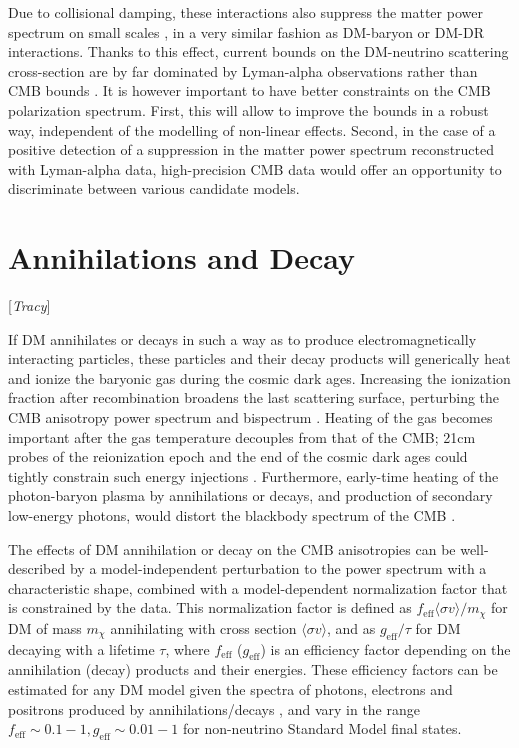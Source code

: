 \documentclass[12pt]{article}
\newcommand{\Contributors}[1]{ {\footnotesize [\textit{#1}]}}
\begin{document}
Due to collisional damping, these interactions also suppress the matter power spectrum on small scales \cite{Boehm:2001hm,Mangano:2006mp}, in a very similar fashion as DM-baryon or DM-DR interactions. Thanks to this effect, current bounds on the DM-neutrino scattering cross-section are by far dominated by Lyman-alpha observations \cite{Wilkinson:2014ksa} rather than CMB bounds \cite{Escudero:2015yka,DiValentino:2017oaw,Diacoumis:2018ezi}. It is however important to have better constraints on the CMB polarization spectrum. First, this will allow to improve the bounds in a robust way, independent of the modelling of non-linear effects. Second, in the case of a positive detection of a suppression in the matter power spectrum reconstructed with Lyman-alpha data, high-precision CMB data would offer an opportunity to discriminate between various candidate models.

\section{Annihilations and Decay}
\Contributors{Tracy}

If DM annihilates or decays in such a way as to produce electromagnetically interacting particles, these particles and their decay products will generically heat and ionize the baryonic gas during the cosmic dark ages. Increasing the ionization fraction after recombination broadens the last scattering surface, perturbing the CMB anisotropy power spectrum \cite{Adams:1998nr,Chen:2003gz, Padmanabhan:2005es} and bispectrum \cite{Dvorkin:2013cga}. Heating of the gas becomes important after the gas temperature decouples from that of the CMB; 21cm probes of the reionization epoch and the end of the cosmic dark ages could tightly constrain such energy injections \cite{Furlanetto:2006wp,Valdes:2007cu,Evoli:2014pva,Lopez-Honorez:2016sur,Poulin:2016anj}. Furthermore, early-time heating of the photon-baryon plasma by annihilations or decays, and production of secondary low-energy photons, would  distort the blackbody spectrum of the CMB \cite{Chluba:2013wsa}.

The effects of DM annihilation \cite{Slatyer:2015jla} or decay \cite{Slatyer:2016qyl} on the CMB anisotropies can be well-described by a model-independent perturbation to the power spectrum with a characteristic shape, combined with a model-dependent normalization factor that is constrained by the data. This normalization factor is defined as $f_\text{eff} \langle \sigma v \rangle/m_\chi$ for DM of mass $m_\chi$ annihilating with cross section $\langle \sigma v \rangle$, and as $g_\text{eff}/\tau$ for DM decaying with a lifetime $\tau$, where $f_\text{eff}$ ($g_\text{eff}$) is an efficiency factor depending on the annihilation (decay) products and their energies. These efficiency factors can be estimated for any DM model given the spectra of photons, electrons and positrons produced by annihilations/decays \cite{Slatyer:2015kla}, and vary in the range $f_\text{eff} \sim 0.1-1, g_\text{eff} \sim 0.01-1$ for non-neutrino Standard Model final states.
\end{document}

